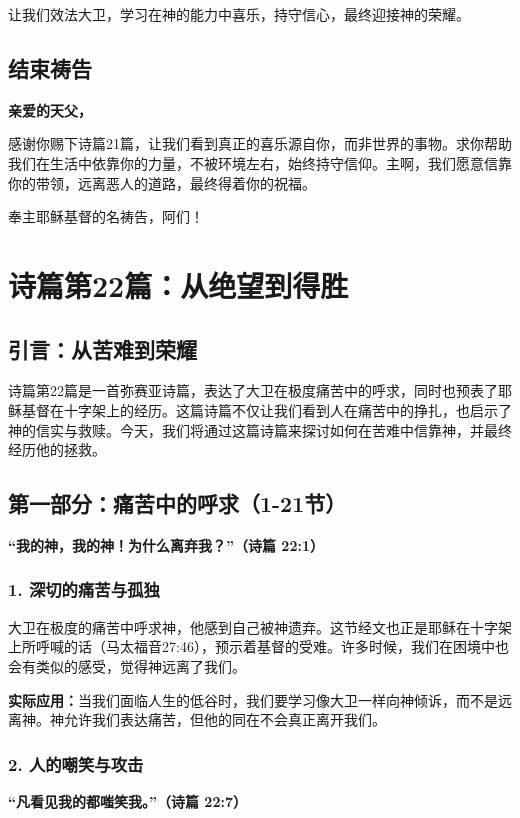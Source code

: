 \documentclass[a4paper, 12pt]{article}
\begin{document}
让我们效法大卫，学习在神的能力中喜乐，持守信心，最终迎接神的荣耀。

\subsection*{结束祷告}

\textbf{亲爱的天父，}

感谢你赐下诗篇21篇，让我们看到真正的喜乐源自你，而非世界的事物。求你帮助我们在生活中依靠你的力量，不被环境左右，始终持守信仰。主啊，我们愿意信靠你的带领，远离恶人的道路，最终得着你的祝福。

奉主耶稣基督的名祷告，阿们！
\newpage
\section{诗篇第22篇：从绝望到得胜}

\subsection*{引言：从苦难到荣耀}

诗篇第22篇是一首弥赛亚诗篇，表达了大卫在极度痛苦中的呼求，同时也预表了耶稣基督在十字架上的经历。这篇诗篇不仅让我们看到人在痛苦中的挣扎，也启示了神的信实与救赎。今天，我们将通过这篇诗篇来探讨如何在苦难中信靠神，并最终经历他的拯救。

\subsection*{第一部分：痛苦中的呼求（1-21节）}

\textbf{“我的神，我的神！为什么离弃我？”（诗篇 22:1）}

\subsubsection*{1. 深切的痛苦与孤独}
大卫在极度的痛苦中呼求神，他感到自己被神遗弃。这节经文也正是耶稣在十字架上所呼喊的话（马太福音27:46），预示着基督的受难。许多时候，我们在困境中也会有类似的感受，觉得神远离了我们。

\textbf{实际应用：}当我们面临人生的低谷时，我们要学习像大卫一样向神倾诉，而不是远离神。神允许我们表达痛苦，但他的同在不会真正离开我们。

\subsubsection*{2. 人的嘲笑与攻击}
\textbf{“凡看见我的都嗤笑我。”（诗篇 22:7）}
\end{document}
